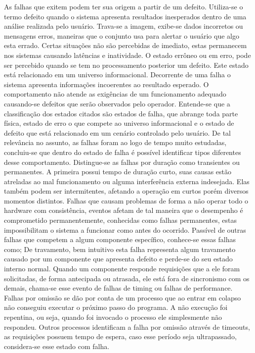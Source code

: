 As falhas que exitem podem ter sua origem a partir de um defeito. Utiliza-se o termo defeito quando o sistema apresenta resultados inesperados dentro de uma análise realizada pelo usuário. Trava-se a imagem, exibe-se dados incorretos ou mensagens erros, maneiras que o conjunto usa para alertar o usuário que algo esta errado. Certas situações não são percebidas de imediato, estas permanecem nos sistemas causando latências e inatividade.
O estado errôneo ou em erro, pode ser percebido quando se tem no processamento posterior um defeito. Este estado está relacionado em um universo informacional. Decorrente de uma falha o sistema apresenta informações incoerentes ao resultado esperado. O comportamento não atende as exigências de um funcionamento adequado causando-se defeitos que serão observados pelo operador. Entende-se que a classificação dos estados citados são estados de falha, que abrange toda parte física, estado de erro o que compete ao universo informacional e o estado de defeito que está relacionado em um cenário controlado pelo usuário.
De tal relevância no assunto, as falhas foram ao logo de tempo muito estudadas, concluiu-se que dentro do estado de falha é possível identificar tipos diferentes desse comportamento.
Distingue-se as falhas por duração como transientes ou permanentes. A primeira possui tempo de duração curto, suas causas estão atreladas ao mal funcionamento ou alguma interferência externa indesejada. Elas também podem ser intermitentes, afetando a operação em curtos porém diversos momentos distintos.
Falhas que causam problemas de forma a não operar todo o hardware com consistência,
 eventos afetam de tal maneira que o desempenho é comprometido permanentemente, conhecidas como falhas permanentes, estas impossibilitam o sistema a funcionar como antes do ocorrido.
Passível de outras falhas que competem a algum componente específico, conhece-se essas falhas como;
De travamento, bem intuitivo esta falha representa algum travamento causado por um componente que apresenta defeito e perde-se do seu estado interno normal.
Quando um componente responde requisições que a ele foram solicitadas, de forma antecipada ou atrasada, ele está fora de sincronismo com os demais, chama-se esse evento de falhas de timing ou falhas de performance.
Falhas por omissão se dão por conta de um processo que ao entrar em colapso não conseguiu executar o próximo passo do programa. A não execução foi repentina, ou seja, quando foi invocado o processo ele simplesmente não respondeu. Outros processos identificam a falha por omissão através de timeouts, as requisições possuem tempo de espera, caso esse período seja ultrapassado, considera-se esse estado com falha.
